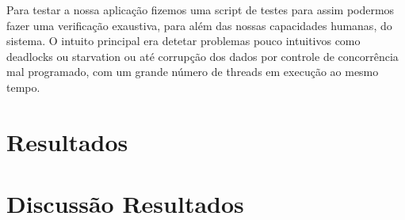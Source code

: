 Para testar a nossa aplicação fizemos uma script de testes para assim podermos fazer uma verificação exaustiva, para além das nossas capacidades humanas, do sistema. O intuito principal era detetar problemas pouco intuitivos como deadlocks ou starvation ou até corrupção dos dados por controle de concorrência mal programado, com um grande número de threads em execução ao mesmo tempo.

\section{Resultados}

\section{Discussão Resultados}




